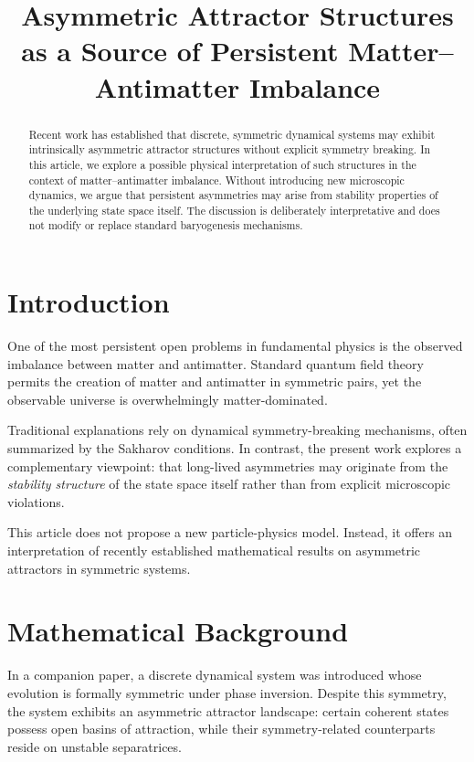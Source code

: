 \documentclass[11pt]{article}
\title{Asymmetric Attractor Structures as a Source of Persistent Matter--Antimatter Imbalance}
\author{}
\date{}
\begin{document}
\maketitle

\begin{abstract}
Recent work has established that discrete, symmetric dynamical systems may
exhibit intrinsically asymmetric attractor structures without explicit
symmetry breaking. In this article, we explore a possible physical
interpretation of such structures in the context of matter--antimatter
imbalance. Without introducing new microscopic dynamics, we argue that
persistent asymmetries may arise from stability properties of the underlying
state space itself. The discussion is deliberately interpretative and does not
modify or replace standard baryogenesis mechanisms.
\end{abstract}

\section{Introduction}

One of the most persistent open problems in fundamental physics is the observed
imbalance between matter and antimatter. Standard quantum field theory permits
the creation of matter and antimatter in symmetric pairs, yet the observable
universe is overwhelmingly matter-dominated.

Traditional explanations rely on dynamical symmetry-breaking mechanisms, often
summarized by the Sakharov conditions. In contrast, the present work explores a
complementary viewpoint: that long-lived asymmetries may originate from the
\emph{stability structure} of the state space itself rather than from explicit
microscopic violations.

This article does not propose a new particle-physics model. Instead, it offers
an interpretation of recently established mathematical results on asymmetric
attractors in symmetric systems.

\section{Mathematical Background}

In a companion paper, a discrete dynamical system was introduced whose evolution
is formally symmetric under phase inversion. Despite this symmetry, the system
exhibits an asymmetric attractor landscape: certain coherent states possess
open basins of attraction, while their symmetry-related counterparts reside on
unstable separatrices.
\end{document}
